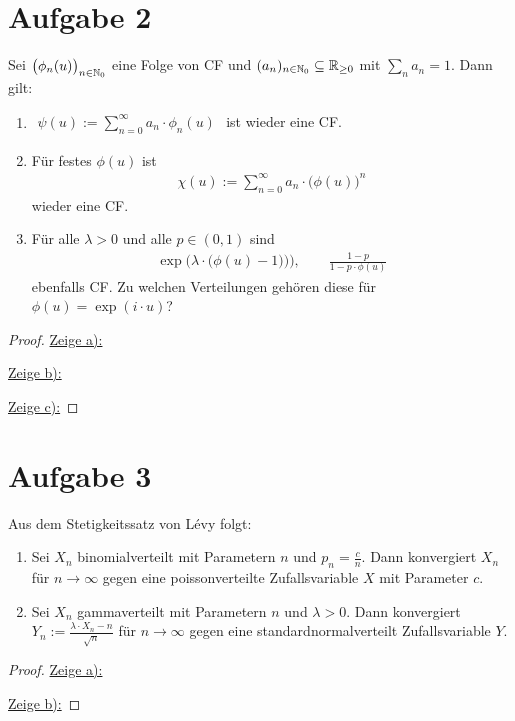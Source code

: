 \documentclass[12pt,a4paper]{article}
\begin{document}
\section*{Aufgabe 2}
Sei $\big(\phi_n(u)\big)_{n\in\mathbb{N}_0}$ eine Folge von CF und $(a_n)_{n\in\mathbb{N}_0}\subseteq\mathbb{R}_{\geq0}$ mit $\sum\limits_n a_n=1$.
Dann gilt:
\begin{enumerate}[label=\alph*)]
	\item $\begin{aligned}
		\psi(u):=\sum\limits_{n=0}^\infty a_n\cdot\phi_n(u)
	\end{aligned}$ ist wieder eine CF.
	\item Für festes $\phi(u)$ ist 
	\begin{align*}
		\chi(u):=\sum\limits_{n=0}^\infty a_n\cdot\big(\phi(u)\big)^n
	\end{align*}
	wieder eine CF.
	\item Für alle $\lambda>0$ und alle $p\in(0,1)$ sind
	\begin{align*}
		\exp\Big(\lambda\cdot\big(\phi(u)-1)\big)\Big),\qquad
		\frac{1-p}{1-p\cdot\phi(u)}
	\end{align*}
	ebenfalls CF. Zu welchen Verteilungen gehören diese für $\phi(u)=\exp(i\cdot u)$?
\end{enumerate} 

\begin{proof}
	\underline{Zeige a):}
	
	\underline{Zeige b):}
	
	\underline{Zeige c):}
		
\end{proof}

\section*{Aufgabe 3}
Aus dem Stetigkeitssatz von Lévy folgt:
\begin{enumerate}[label=\alph*)]
	\item Sei $X_n$ binomialverteilt mit Parametern $n$ und $p_n=\frac{c}{n}$.
	Dann konvergiert $X_n$ für $n\to\infty$ gegen eine poissonverteilte Zufallsvariable $X$ mit Parameter $c$.
	\item Sei $X_n$ gammaverteilt mit Parametern $n$ und $\lambda>0$.
	Dann konvergiert $Y_n:=\frac{\lambda\cdot X_n-n}{\sqrt{n}}$ für $n\to\infty$ gegen eine standardnormalverteilt Zufallsvariable $Y$.
\end{enumerate}

\begin{proof}
	\underline{Zeige a):}
	
	\underline{Zeige b):}
\end{proof}
\end{document}
